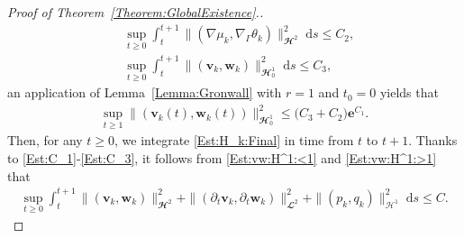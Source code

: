 \documentclass[10pt,reqno]{amsart}
\theoremstyle{remark}
\numberwithin{equation}{section}
\newcommand{\norm}[1]{\| #1 \|}
\newcommand{\bv}{\mathbf{v}}
\newcommand{\bw}{\mathbf{w}}
\newcommand{\ds}{\;\mathrm ds}
\newcommand{\delt}{\partial_{t}}
\newcommand{\Grad}{\nabla}
\newcommand{\Gradg}{\nabla_\Ga}
\newcommand{\e}{\mathbf{e}}
\newcommand{\Ga}{\Gamma}
\begin{document}
\begin{proof}[Proof of Theorem~\ref{Theorem:GlobalExistence}.]
\begin{align}
    &\sup_{t\geq 0}\int_t^{t+1} \norm{(\Grad\mu_k,\Gradg\theta_k)}_{\mathbfcal{H}^2}^2 \ds \leq C_2, \label{Est:C_2} \\
    &\sup_{t\geq 0}\int_t^{t+1} \norm{(\bv_k,\bw_k)}_{\mathbfcal{H}^1_{0}}^2\ds \leq C_3, \label{Est:C_3}
\end{align}
an application of Lemma~\ref{Lemma:Gronwall} with $r = 1$ and $t_0 = 0$ yields that
\begin{align}\label{Est:vw:H^1:>1}
    \sup_{t\geq 1} \norm{(\bv_k(t),\bw_k(t))}_{\mathbfcal{H}^1_{0}}^2 \leq \big(C_3 + C_2)\e^{C_1}.
\end{align}
Then, for any $t \geq 0$, we integrate \eqref{Est:H_k:Final} in time from $t$ to $t+1$. Thanks to \eqref{Est:C_1}-\eqref{Est:C_3}, it follows from \eqref{Est:vw:H^1:<1} and \eqref{Est:vw:H^1:>1} that
\begin{align}\label{Est:vw:H^2:delt:L^2:pq:uloc}
    \sup_{t\geq 0}\int_t^{t+1} \norm{(\bv_k,\bw_k)}_{\mathbfcal{H}^2}^2 + \norm{(\delt\bv_k,\delt\bw_k)}_{\mathbfcal{L}^2}^2 + \norm{(p_k,q_k)}_{\mathcal{H}^1}^2 \ds \leq C.
\end{align}


\end{proof}
\end{document}
